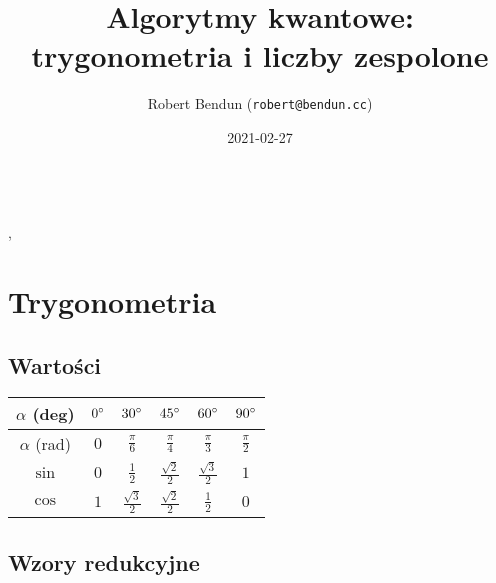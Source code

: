 \documentclass[a5paper,8pt]{extarticle}
\title{\textbf{Algorytmy kwantowe}: trygonometria i liczby zespolone}
\date{2021-02-27}
\author{Robert Bendun (\texttt{robert@bendun.cc})}
\begin{document}
\begin{center}
\makeatletter
{\Large \@title} \\ \@date, \@author \\
\makeatother
\end{center}

\section{Trygonometria}

\subsection{Wartości}

\begin{center}
\begin{tabular}{ |c|c|c|c|c|c| } \hline
	$\alpha$ (deg) & $0\degree$ & $30\degree$ & $45\degree$ & $60\degree$ & $90\degree$ \\ \hline
	$\alpha$ (rad) & $0$ & $\frac{\pi}{6}$ & $\frac{\pi}{4}$ & $\frac{\pi}{3}$ & $\frac{\pi}{2}$ \\ \hline
	$\sin$ & $0$ & $\frac{1}{2}$ & $\frac{\sqrt{2}}{2}$ & $\frac{\sqrt{3}}{2}$ & $1$ \\  \hline
	$\cos$ & $1$ & $\frac{\sqrt{3}}{2}$ & $\frac{\sqrt{2}}{2}$ & $\frac{1}{2}$ & $0$ \\ \hline
\end{tabular}
\end{center}

\subsection{Wzory redukcyjne}
\end{document}
